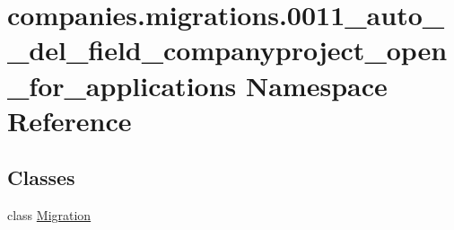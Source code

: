 \hypertarget{namespacecompanies_1_1migrations_1_10011__auto____del__field__companyproject__open__for__applications}{\section{companies.\-migrations.0011\-\_\-auto\-\_\-\-\_\-del\-\_\-field\-\_\-companyproject\-\_\-open\-\_\-for\-\_\-applications Namespace Reference}
\label{namespacecompanies_1_1migrations_1_10011__auto____del__field__companyproject__open__for__applications}
}
\subsection*{Classes}
\begin{DoxyCompactItemize}
\item 
class \hyperlink{classcompanies_1_1migrations_1_10011__auto____del__field__companyproject__open__for__applications_1_1_migration}{Migration}
\end{DoxyCompactItemize}
